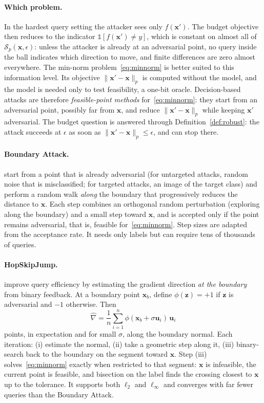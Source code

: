 \documentclass[10pt,a4paper]{extarticle}
\theoremstyle{definition}
\newcommand{\x}{\mathbf{x}}
\newcommand{\xadv}{\mathbf{x}'}
\begin{document}
\paragraph{Which problem.} In the hardest query setting the attacker sees only \(f(\xadv)\). The budget objective then reduces to the indicator \(\mathbb{1}[f(\xadv)\neq y]\), which is constant on almost all of \(\mathcal{S}_p(\x,\epsilon)\): unless the attacker is already at an adversarial point, no query inside the ball indicates which direction to move, and finite differences are zero almost everywhere. The min-norm problem~\eqref{eq:minnorm} is better suited to this information level. Its objective \(\|\xadv-\x\|_p\) is computed without the model, and the model is needed only to test feasibility, a one-bit oracle. Decision-based attacks are therefore \emph{feasible-point methods} for~\eqref{eq:minnorm}: they start from an adversarial point, possibly far from \(\x\), and reduce \(\|\xadv-\x\|_p\) while keeping \(\xadv\) adversarial. The budget question is answered through Definition~\ref{def:robust}: the attack succeeds at \(\epsilon\) as soon as \(\|\xadv-\x\|_p\le\epsilon\), and can stop there.

\paragraph{Boundary Attack.} \citet{brendel2018decision} start from a point that is already adversarial (for untargeted attacks, random noise that is misclassified; for targeted attacks, an image of the target class) and perform a random walk \emph{along} the boundary that progressively reduces the distance to \(\x\). Each step combines an orthogonal random perturbation (exploring along the boundary) and a small step toward \(\x\), and is accepted only if the point remains adversarial, that is, feasible for~\eqref{eq:minnorm}. Step sizes are adapted from the acceptance rate. It needs only labels but can require tens of thousands of queries.

\paragraph{HopSkipJump.} \citet{chen2020hopskipjump} improve query efficiency by estimating the gradient direction \emph{at the boundary} from binary feedback. At a boundary point \(\x_b\), define \(\phi(\mathbf{z}) = +1\) if \(\mathbf{z}\) is adversarial and \(-1\) otherwise. Then
\[
\widehat{\nabla} = \frac{1}{n}\sum_{i=1}^{n}\phi(\x_b+\sigma\mathbf{u}_i)\,\mathbf{u}_i
\]
points, in expectation and for small \(\sigma\), along the boundary normal. Each iteration: (i) estimate the normal, (ii) take a geometric step along it, (iii) binary-search back to the boundary on the segment toward \(\x\). Step (iii) solves~\eqref{eq:minnorm} exactly when restricted to that segment: \(\x\) is infeasible, the current point is feasible, and bisection on the label finds the crossing closest to \(\x\) up to the tolerance. It supports both \(\ell_2\) and \(\ell_\infty\) and converges with far fewer queries than the Boundary Attack.
\end{document}

